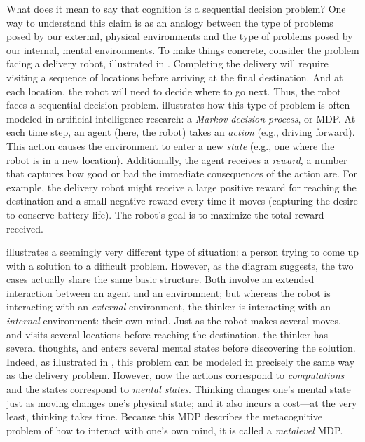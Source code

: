 \documentclass[11pt,a4paperpaper,]{article}
\begin{document}
What does it mean to say that cognition is a sequential decision problem? One way to understand this claim is as an analogy between the type of problems posed by our external, physical environments and the type of problems posed by our internal, mental environments. To make things concrete, consider the problem facing a delivery robot, illustrated in . Completing the delivery will require visiting a sequence of locations before arriving at the final destination. And at each location, the robot will need to decide where to go next. Thus, the robot faces a sequential decision problem.  illustrates how this type of problem is often modeled in artificial intelligence research: a \emph{Markov decision process}, or MDP. At each time step, an agent (here, the robot) takes an \emph{action} (e.g., driving forward). This action causes the environment to enter a new \emph{state} (e.g., one where the robot is in a new location). Additionally, the agent receives a \emph{reward}, a number that captures how good or bad the immediate consequences of the action are. For example, the delivery robot might receive a large positive reward for reaching the destination and a small negative reward every time it moves (capturing the desire to conserve battery life). The robot's goal is to maximize the total reward received.

 illustrates a seemingly very different type of situation: a person trying to come up with a solution to a difficult problem. However, as the diagram suggests, the two cases actually share the same basic structure. Both involve an extended interaction between an agent and an environment; but whereas the robot is interacting with an \emph{external} environment, the thinker is interacting with an \emph{internal} environment: their own mind. Just as the robot makes several moves, and visits several locations before reaching the destination, the thinker has several thoughts, and enters several mental states before discovering the solution. Indeed, as illustrated in , this problem can be modeled in precisely the same way as the delivery problem. However, now the actions correspond to \emph{computations} and the states correspond to \emph{mental states}. Thinking changes one's mental state just as moving changes one's physical state; and it also incurs a cost---at the very least, thinking takes time. Because this MDP describes the metacognitive problem of how to interact with one's own mind, it is called a \emph{metalevel} MDP.
\end{document}
